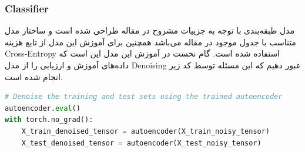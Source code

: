 \documentclass{article}
\begin{document}
\subsubsection{Classifier}
مدل طبقه‌بندی با توجه به جزییات مشروح در مقاله طراحی شده است و ساختار مدل متناسب با جدول موجود در مقاله می‌باشد همچنین برای آموزش این مدل از تابع هزینه 
Cross-Entropy
استفاده شده است. 
گام نخست در آموزش این مدل این است که داده‌های آموزش و ارزیابی را از مدل 
Denoising
عبور دهیم که این مسئله توسط کد زیر انجام شده است.
\begin{LTR}
	\begin{lstlisting}[language=Python, caption=Remove noise]
# Denoise the training and test sets using the trained autoencoder
autoencoder.eval()
with torch.no_grad():
    X_train_denoised_tensor = autoencoder(X_train_noisy_tensor)
    X_test_denoised_tensor = autoencoder(X_test_noisy_tensor)
	\end{lstlisting}
\end{LTR}
\end{document}
